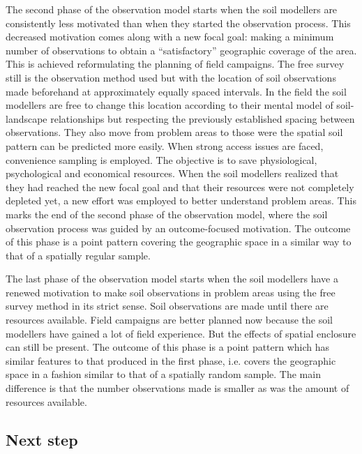 The second phase of the observation model starts when the soil modellers are consistently less motivated than 
when they started the observation process. This decreased motivation comes along with a new focal goal: making 
a minimum number of observations to obtain a ``satisfactory'' geographic coverage of the area. This is achieved
reformulating the planning of field campaigns. The free survey still is the observation method used but with 
the location of soil observations made beforehand at approximately equally spaced intervals. In the field the 
soil modellers are free to change this location according to their mental model of soil-landscape 
relationships but respecting the previously established spacing between observations. They also move from 
problem areas to those were the spatial soil pattern can be predicted more easily. When strong access issues 
are faced, convenience sampling is employed. The objective is to save physiological, psychological and 
economical resources. When the soil modellers realized that they had reached the new focal goal and that their
resources were not completely depleted yet, a new effort was employed to better understand problem areas. This 
marks the end of the second phase of the observation model, where the soil observation process was guided by an
outcome-focused motivation. The outcome of this phase is a point pattern covering the geographic space in a 
similar way to that of a spatially regular sample.

The last phase of the observation model starts when the soil modellers have a renewed motivation to make soil 
observations in problem areas using the free survey method in its strict sense. Soil observations are made 
until there are resources available. Field campaigns are better planned now because the soil modellers have 
gained a lot of field experience. But the effects of spatial enclosure can still be present. The outcome of 
this phase is a point pattern which has similar features to that produced in the first phase, i.e. covers the 
geographic space in a fashion similar to that of a spatially random sample. The main difference is that the 
number observations made is smaller as was the amount of resources available.

\subsection{Next step}

